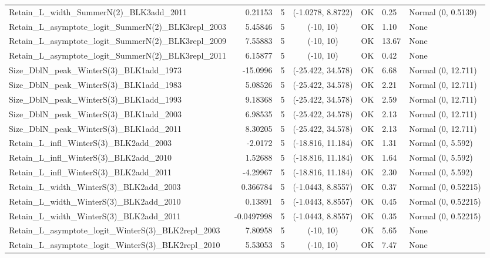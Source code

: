 \documentclass[12pt,]{article}
\begin{document}
\begin{landscape}
\begin{longtable}{lrcccll}
  Retain\_L\_width\_SummerN(2)\_BLK3add\_2011 & 0.21153 & 5 & (-1.0278, 8.8722) & OK & 0.25 & Normal (0, 0.5139) \\ 
  Retain\_L\_asymptote\_logit\_SummerN(2)\_BLK3repl\_2003 & 5.45846 & 5 & (-10, 10) & OK & 1.10 & None \\ 
  Retain\_L\_asymptote\_logit\_SummerN(2)\_BLK3repl\_2009 & 7.55883 & 5 & (-10, 10) & OK & 13.67 & None \\ 
  Retain\_L\_asymptote\_logit\_SummerN(2)\_BLK3repl\_2011 & 6.15877 & 5 & (-10, 10) & OK & 0.42 & None \\ 
  Size\_DblN\_peak\_WinterS(3)\_BLK1add\_1973 & -15.0996 & 5 & (-25.422, 34.578) & OK & 6.68 & Normal (0, 12.711) \\ 
  Size\_DblN\_peak\_WinterS(3)\_BLK1add\_1983 & 5.08526 & 5 & (-25.422, 34.578) & OK & 2.21 & Normal (0, 12.711) \\ 
  Size\_DblN\_peak\_WinterS(3)\_BLK1add\_1993 & 9.18368 & 5 & (-25.422, 34.578) & OK & 2.59 & Normal (0, 12.711) \\ 
  Size\_DblN\_peak\_WinterS(3)\_BLK1add\_2003 & 6.98535 & 5 & (-25.422, 34.578) & OK & 2.13 & Normal (0, 12.711) \\ 
  Size\_DblN\_peak\_WinterS(3)\_BLK1add\_2011 & 8.30205 & 5 & (-25.422, 34.578) & OK & 2.13 & Normal (0, 12.711) \\ 
  Retain\_L\_infl\_WinterS(3)\_BLK2add\_2003 & -2.0172 & 5 & (-18.816, 11.184) & OK & 1.31 & Normal (0, 5.592) \\ 
  Retain\_L\_infl\_WinterS(3)\_BLK2add\_2010 & 1.52688 & 5 & (-18.816, 11.184) & OK & 1.64 & Normal (0, 5.592) \\ 
  Retain\_L\_infl\_WinterS(3)\_BLK2add\_2011 & -4.29967 & 5 & (-18.816, 11.184) & OK & 2.30 & Normal (0, 5.592) \\ 
  Retain\_L\_width\_WinterS(3)\_BLK2add\_2003 & 0.366784 & 5 & (-1.0443, 8.8557) & OK & 0.37 & Normal (0, 0.52215) \\ 
  Retain\_L\_width\_WinterS(3)\_BLK2add\_2010 & 0.13891 & 5 & (-1.0443, 8.8557) & OK & 0.45 & Normal (0, 0.52215) \\ 
  Retain\_L\_width\_WinterS(3)\_BLK2add\_2011 & -0.0497998 & 5 & (-1.0443, 8.8557) & OK & 0.35 & Normal (0, 0.52215) \\ 
  Retain\_L\_asymptote\_logit\_WinterS(3)\_BLK2repl\_2003 & 7.80958 & 5 & (-10, 10) & OK & 5.65 & None \\ 
  Retain\_L\_asymptote\_logit\_WinterS(3)\_BLK2repl\_2010 & 5.53053 & 5 & (-10, 10) & OK & 7.47 & None \\ 

\end{longtable}
\end{landscape}
\end{document}
